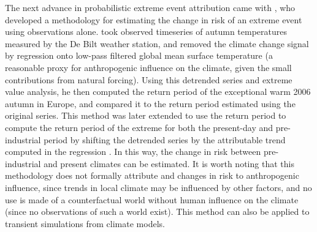     The next advance in probabilistic extreme event attribution came with \citet{van_oldenborgh_how_2007}, who developed a methodology for estimating the change in risk of an extreme event using observations alone. \citeauthor{van_oldenborgh_how_2007} took observed timeseries of autumn temperatures measured by the De Bilt weather station, and removed the climate change signal by regression onto low-pass filtered global mean surface temperature (a reasonable proxy for anthropogenic influence on the climate, given the small contributions from natural forcing). Using this detrended series and extreme value analysis, he then computed the return period of the exceptional warm 2006 autumn in Europe, and compared it to the return period estimated using the original series. This method was later extended to use the return period to compute the return period of the extreme for both the present-day and pre-industrial period by shifting the detrended series by the attributable trend computed in the regression \citep[eg.][]{philip_protocol_2020,leach_anthropogenic_2020}. In this way, the change in risk between pre-industrial and present climates can be estimated. It is worth noting that this methodology does not formally attribute and changes in risk to anthropogenic influence, since trends in local climate may be influenced by other factors, and no use is made of a counterfactual world without human influence on the climate (since no observations of such a world exist). This method can also be applied to transient simulations from climate models.

